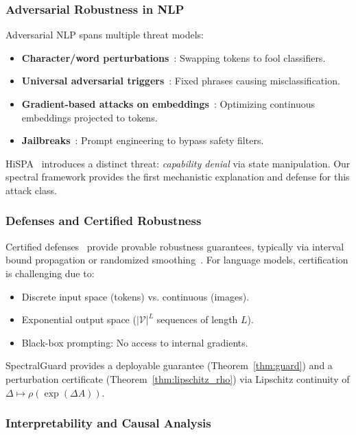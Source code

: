\documentclass[10pt,twocolumn]{article}
\begin{document}
\subsubsection{Adversarial Robustness in NLP}

Adversarial NLP spans multiple threat models:
\begin{itemize}
\item \textbf{Character/word perturbations}~\cite{ebrahimi2018hotflip,gao2018black}: Swapping tokens to fool classifiers.
\item \textbf{Universal adversarial triggers}~\cite{wallace2019universal}: Fixed phrases causing misclassification.
\item \textbf{Gradient-based attacks on embeddings}~\cite{zou2023universal}: Optimizing continuous embeddings projected to tokens.
\item \textbf{Jailbreaks}~\cite{liu2023jailbreak,wei2023jailbroken}: Prompt engineering to bypass safety filters.
\end{itemize}

HiSPA~\cite{lemercier2026hispa} introduces a distinct threat: \emph{capability denial} via state manipulation. Our spectral framework provides the first mechanistic explanation and defense for this attack class.

\subsubsection{Defenses and Certified Robustness}

Certified defenses~\cite{jia2019certified,huang2019achieving} provide provable robustness guarantees, typically via interval bound propagation or randomized smoothing~\cite{cohen2019certified}. For language models, certification is challenging due to:
\begin{itemize}
\item Discrete input space (tokens) vs. continuous (images).
\item Exponential output space ($|\mathcal{V}|^L$ sequences of length $L$).
\item Black-box prompting: No access to internal gradients.
\end{itemize}

SpectralGuard provides a deployable guarantee (Theorem~\ref{thm:guard}) and a perturbation certificate (Theorem~\ref{thm:lipschitz_rho}) via Lipschitz continuity of $\Delta \mapsto \rho(\exp(\Delta A))$.

\subsubsection{Interpretability and Causal Analysis}
\end{document}

